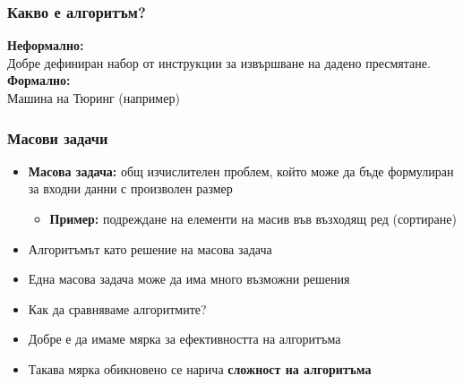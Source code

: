 \documentclass[alsotrans]{beamerswitch}
\begin{document}
\begin{frame}
  \frametitle{Какво е алгоритъм?}

  \pause
  \textbf{Неформално:}\\
  Добре дефиниран набор от инструкции за извършване на дадено пресмятане.\\[2em]
  \pause
  \textbf{Формално:}\\
  Машина на Тюринг (например)
\end{frame}

\begin{frame}
  \frametitle{Масови задачи}

  \begin{itemize}[<+->]
  \item \textbf{Масова задача:} общ изчислителен проблем, който може да бъде формулиран за входни данни с произволен размер
    \begin{itemize}
    \item \textbf{Пример:} подреждане на елементи на масив във възходящ ред (сортиране)
    \end{itemize}
  \item Алгоритъмът като решение на масова задача
  \item Една масова задача може да има много възможни решения
  \item \alert{Как да сравняваме алгоритмите?}
  \item Добре е да имаме мярка за ефективността на алгоритъма
  \item Такава мярка обикновено се нарича \textbf{сложност на алгоритъма}
  \end{itemize}
\end{frame}
\end{document}
